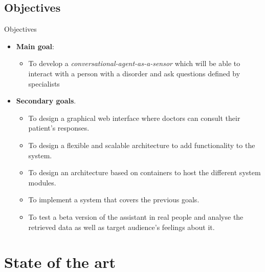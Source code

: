 \documentclass{beamer}
\begin{document}
\subsection{Objectives}
\begin{frame}[fragile]{Objectives}
  \begin{itemize}[<+->]
    \item \textbf{Main goal}:
    \begin{itemize}[<+->]
      \item To develop a \emph{conversational-agent-as-a-sensor} which will be able to interact with a person with a disorder and ask questions defined by specialists
    \end{itemize}
    \item \textbf{Secondary goals}.
      \begin{itemize}[<+->]
        \item To design a graphical web interface where doctors can consult their patient's responses.
        \item To design a flexible and scalable architecture to add functionality to the system.
        \item To design an architecture based on containers to host the different system modules.
        \item To implement a system that covers the previous goals.
        \item To test a beta version of the assistant in real people and analyse the retrieved data as well as target audience's feelings about it.
      \end{itemize}
  \end{itemize}
\end{frame}
\section{State of the art}
\end{document}
